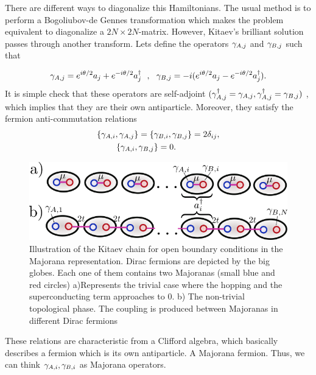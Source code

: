 There are different ways to diagonalize this Hamiltonians. The usual method is to perform a Bogoliubov-de Gennes transformation which makes the problem equivalent to diagonalize a $2N\times2N$-matrix. However, Kitaev's brilliant solution passes through another transform. Lets define the operators $\gamma_{A,j}$ and $\gamma_{B,j}$ such that

\begin{equation}
\gamma_{A,j} = e^{i\theta /2}a_j+ e^{-i\theta/2 } a^{\dagger}_j \ \ , \ \ \gamma_{B,j} = -i(e^{i\theta /2}a_j - e^{-i\theta/2} a^{\dagger}_j).
\label{eq:MajoranaTrans}
\end{equation}
It is simple check that these operators are self-adjoint $(\gamma_{A,j}^\dagger = \gamma_{A,j}, \gamma_{A,j}^\dagger = \gamma_{B,j})$ , which implies that they are their own antiparticle.  Moreover, they satisfy the fermion anti-commutation relations
\begin{equation}
\begin{aligned}
\{\gamma_{A,i}, \gamma_{A,j}\} = \{ & \gamma_{B,i} , \gamma_{B,j}\} = 2\delta_{ij}  ,\\ 
  \{\gamma_{A,i}, \gamma_{B,j} & \} =0.
\end{aligned} 
\label{MajoranaRel}
\end{equation} 

\begin{figure}[t]
    \centering
    \includegraphics[scale=0.5]{IMAGES/Majorana/KitaevChain.png}
    
    \caption{ \label{fig:top.phases kitaev} Illustration of the Kitaev chain for open boundary conditions in the Majorana representation. Dirac fermions are depicted by the big globes. Each one of them contains two Majoranas (small blue and red circles) a)Represents the trivial case where the hopping and the superconducting term approaches to $0$. b) The non-trivial topological phase. The coupling is produced between Majoranas in different Dirac fermions \protect{} }
\end{figure} 
\noindent These relations are characteristic from a Clifford algebra, which basically describes a fermion which is its own antiparticle. A Majorana fermion. Thus, we can think $\gamma_{A,i} , \gamma_{B,i}$ as Majorana operators.

